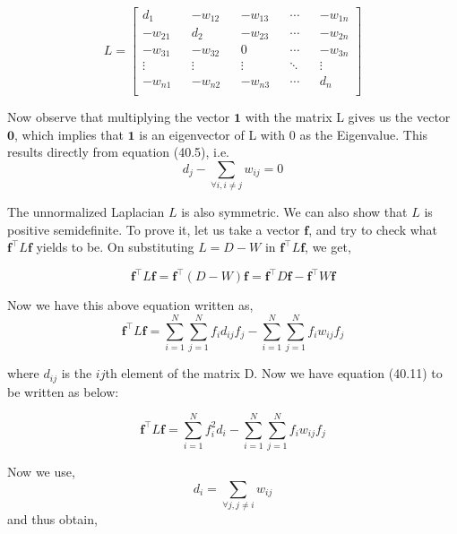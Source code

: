 \documentclass[english]{article}
\theoremstyle{plain}
\begin{document}
\begin{equation}
L =
\begin{bmatrix}
d_{1} && -w_{12} && -w_{13} && \cdots && -w_{1n} \\
-w_{21} && d_{2} && -w_{23} && \cdots && -w_{2n} \\
-w_{31} && -w_{32} && 0 && \cdots && -w_{3n} \\
\vdots && \vdots && \vdots && \ddots && \vdots \\
-w_{n1} && -w_{n2} && -w_{n3} && \cdots && d_{n} \\
\end{bmatrix}
\end{equation}

Now observe that multiplying the vector $\boldsymbol{1}$ with the matrix L gives us the vector $\boldsymbol{0}$, which implies that $\boldsymbol{1}$ is an eigenvector of L with 0 as the Eigenvalue. This results directly from equation (40.5), i.e.
\begin{equation}
 d_{j} - \sum_{\forall i, i\neq j} w_{ij} = 0
\end{equation}

The unnormalized Laplacian \(L\) is also symmetric. We can also show that \(L\) is positive semidefinite. To prove it, let us take a vector $\boldsymbol{f}$, and try to check what $\boldsymbol{f}^{\top}L\boldsymbol{f}$ yields to be. On substituting $L = D-W$ in $\boldsymbol{f}^{\top}L\boldsymbol{f}$, we get,

\begin{equation}
\boldsymbol{f}^{\top}L\boldsymbol{f} = \boldsymbol{f}^{\top}(D-W)\boldsymbol{f}=
\boldsymbol{f}^{\top}D\boldsymbol{f} - \boldsymbol{f}^{\top}W\boldsymbol{f}
\end{equation}

Now we have this above equation written as,
\begin{equation}
\boldsymbol{f}^{\top}L\boldsymbol{f} = 
\sum_{i=1}^{N} \sum_{j=1}^{N} f_{i} d_{ij} f_{j}
- \sum_{i=1}^{N} \sum_{j=1}^{N} f_{i} w_{ij} f_{j}
\end{equation}

where $d_{ij}$ is the $ij$th element of the matrix D. 
Now we have equation (40.11) to be written as below:

\begin{equation}
\boldsymbol{f}^{\top}L\boldsymbol{f} = 
\sum_{i=1}^{N} f^{2}_{i} d_{i}
- \sum_{i=1}^{N} \sum_{j=1}^{N} f_{i} w_{ij} f_{j}
\end{equation}

Now we use,
\begin{equation}
 d_{i} = \sum_{\forall j, j\neq i} w_{ij} \end{equation}
 and thus obtain,
 
\end{document}
